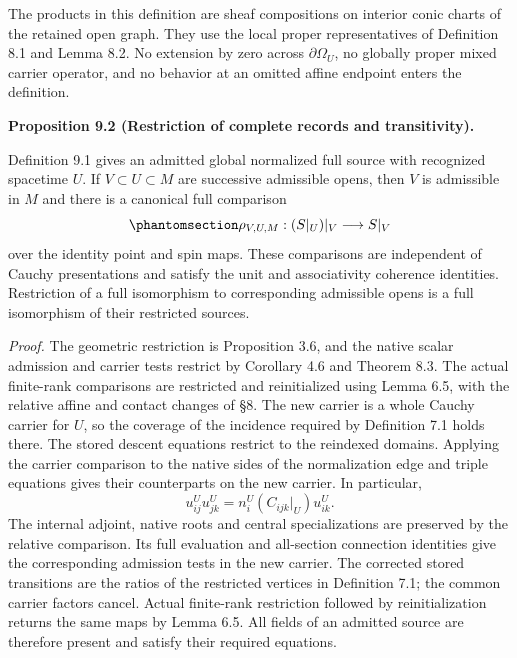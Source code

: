 \documentclass[
  english,
  11pt,
  reqno]{amsart}
\makeatletter
\newcommand{\pandocstatementheading}[1]{%
  \par\if@nobreak\else
    \addpenalty{\@beginparpenalty}%
    \addvspace{.5\baselineskip plus .2\baselineskip minus .2\baselineskip}%
  \fi
  {\normalfont\bfseries #1\par}%
  \nobreak\@afterindenttrue\@afterheading
}
\makeatother
\begin{document}
The products in this definition are sheaf compositions on interior conic
charts of the retained open graph. They use the local proper
representatives of Definition 8.1 and Lemma 8.2. No extension by zero
across \(\partial\Omega_U\), no globally proper mixed carrier operator,
and no behavior at an omitted affine endpoint enters the definition.

\pandocstatementheading{\protect{}\label{prop:global-open-restriction-coherence}Proposition 9.2 (Restriction of complete records and transitivity).}

Definition 9.1 gives an admitted global normalized full source with
recognized spacetime \(U\). If \(V\subset U\subset M\) are successive
admissible opens, then \(V\) is admissible in \(M\) and there is a
canonical full comparison
\begin{equation}\protect\phantomsection\label{eq:global-open-restriction-transitivity}{
\rho_{V,U,M}:(S|_U)|_V\longrightarrow S|_V
}\end{equation} over the identity point and spin maps. These comparisons
are independent of Cauchy presentations and satisfy the unit and
associativity coherence identities. Restriction of a full isomorphism to
corresponding admissible opens is a full isomorphism of their restricted
sources.

\emph{Proof.} The geometric restriction is Proposition 3.6, and the
native scalar admission and carrier tests restrict by Corollary 4.6 and
Theorem 8.3. The actual finite-rank comparisons are restricted and
reinitialized using Lemma 6.5, with the relative affine and contact
changes of §8. The new carrier is a whole Cauchy carrier for \(U\), so
the coverage of the incidence required by Definition 7.1 holds there.
The stored descent equations restrict to the reindexed domains. Applying
the carrier comparison to the native sides of the normalization edge and
triple equations gives their counterparts on the new carrier. In
particular, \[
u_{ij}^Uu_{jk}^U
=n_i^U(C_{ijk}|_U)u_{ik}^U.
\] The internal adjoint, native roots and central specializations are
preserved by the relative comparison. Its full evaluation and
all-section connection identities give the corresponding admission tests
in the new carrier. The corrected stored transitions are the ratios of
the restricted vertices in Definition 7.1; the common carrier factors
cancel. Actual finite-rank restriction followed by reinitialization
returns the same maps by Lemma 6.5. All fields of an admitted source are
therefore present and satisfy their required equations.
\end{document}

